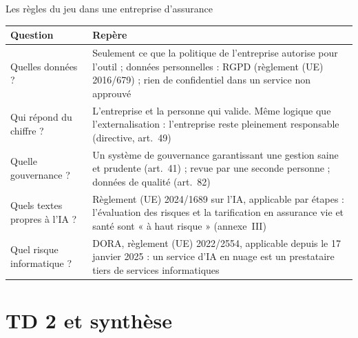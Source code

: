\documentclass[10pt,aspectratio=169]{beamer}
\begin{document}
\begin{frame}{Les règles du jeu dans une entreprise d'assurance}
\begin{table}
\centering
\small
\renewcommand{\arraystretch}{1.35}
\begin{tabular}{p{3cm}p{10cm}}
\toprule
\textbf{Question} & \textbf{Repère} \\
\midrule
Quelles données ? & Seulement ce que la politique de l'entreprise autorise pour l'outil ; données personnelles : RGPD (règlement (UE) 2016/679) ; rien de confidentiel dans un service non approuvé \\
Qui répond du chiffre ? & L'entreprise et la personne qui valide. Même logique que l'externalisation : l'entreprise reste pleinement responsable (directive, art.~49) \\
Quelle gouvernance ? & Un système de gouvernance garantissant une gestion saine et prudente (art.~41) ; revue par une seconde personne ; données de qualité (art.~82) \\
Quels textes propres à l'IA ? & Règlement (UE) 2024/1689 sur l'IA, applicable par étapes : l'évaluation des risques et la tarification en assurance vie et santé sont « à haut risque » (annexe~III) \\
Quel risque informatique ? & DORA, règlement (UE) 2022/2554, applicable depuis le 17 janvier 2025 : un service d'IA en nuage est un prestataire tiers de services informatiques \\
\bottomrule
\end{tabular}
\end{table}
\end{frame}

\section{TD 2 et synthèse}
\end{document}
